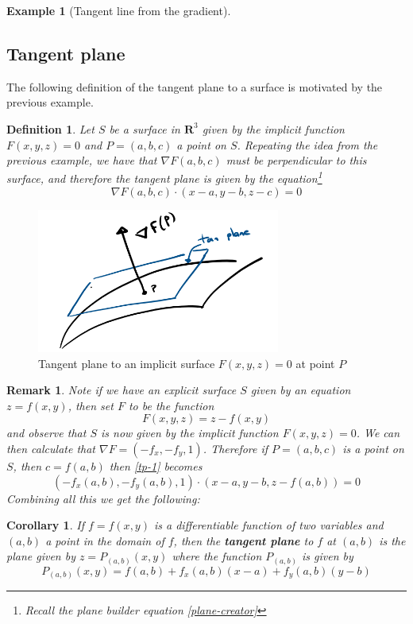 \documentclass[12pt]{article}
\numberwithin{equation}{subsection}
\numberwithin{figure}{subsection}
\newtheorem{defn}[subsection]{Definition}
\newtheorem{corr}[subsection]{Corollary}
\theoremstyle{note}
\newtheorem{example}[subsection]{Example}
\newtheorem{remark}[subsection]{Remark}
\begin{document}
{\begin{example}[Tangent line from the gradient]
\end{example}

\subsection{Tangent plane}
The following definition of the tangent plane to a surface is motivated by the previous example. 

\begin{defn} Let $S$ be a surface in $\mathbf{R}^3$ given by the implicit function $F(x,y,z)=0$ and $P=(a,b,c)$ a point on $S$. Repeating the idea from the previous example, we have that $\nabla F(a,b,c)$ must be perpendicular to this surface, and therefore the tangent plane is given by the equation\footnote{Recall the plane builder equation \eqref{plane-creator}} \begin{equation} \label{tp-1}
	\nabla F(a,b,c) \cdot (x-a,y-b,z-c)=0
\end{equation}
\end{defn}

\begin{figure}[h!]
\centering
\includegraphics[width=80mm]{Images/tan-plan-grad}
\caption{Tangent plane to an implicit surface $F(x,y,z)=0$ at point $P$}
\label{fig-tan-plane-grad}
\end{figure}

\begin{remark}Note if we have an \textit{explicit surface} $S$ given by an equation $z=f(x,y)$, then set $F$ to be the function \[F(x,y,z)=z-f(x,y)\] and observe that $S$ is now given by the implicit function $F(x,y,z)=0$. We can then calculate that $\nabla F=(-f_x, -f_y, 1)$.  Therefore if $P=(a,b,c)$ is a point on $S$, then $c=f(a,b)$ then \eqref{tp-1} becomes \[ (-f_x(a,b),-f_y(a,b),1)\cdot (x-a, y-b,z-f(a,b))=0\] Combining all this we get the following: \end{remark}

\begin{corr} If $f=f(x,y)$ is a differentiable function of two variables and $(a,b)$ a point in the domain of $f$, then the \textbf{tangent plane} to $f$ at $(a,b)$ is the plane given by $z=P_{(a,b)}(x,y)$ where the function $P_{(a,b)}$ is given by \begin{equation} \label{tp-2} P_{(a,b)}(x,y)=f(a,b)+f_x(a,b)(x-a)+f_y(a,b)(y-b)\end{equation}
\end{corr}

}
\end{document}
